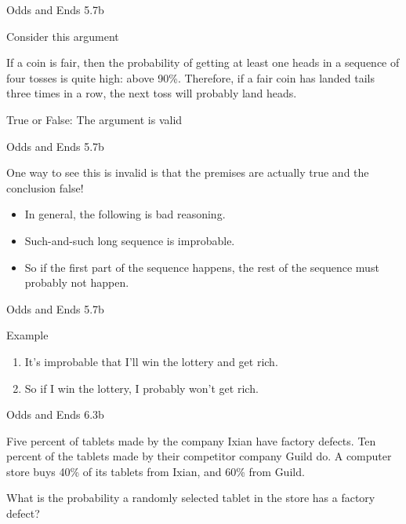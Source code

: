 \documentclass[
  ignorenonframetext,
]{beamer}
\providecommand{\tightlist}{%
  \setlength{\itemsep}{0pt}\setlength{\parskip}{0pt}}
\renewcommand{\,}{\text{, }}
\renewenvironment*{quote}	
	{\list{}{\rightmargin   \leftmargin} \item } 	
	{\endlist }
\begin{document}
\begin{frame}{Odds and Ends 5.7b}
\protect\hypertarget{odds-and-ends-5.7b}{}

Consider this argument

\begin{quote}
If a coin is fair, then the probability of getting at least one heads in
a sequence of four tosses is quite high: above 90\%. Therefore, if a
fair coin has landed tails three times in a row, the next toss will
probably land heads.
\end{quote}

True or False: The argument is valid

\end{frame}

\begin{frame}{Odds and Ends 5.7b}
\protect\hypertarget{odds-and-ends-5.7b-1}{}

One way to see this is invalid is that the premises are actually true
and the conclusion false! \pause

\begin{itemize}
\tightlist
\item
  In general, the following is bad reasoning.
\item
  Such-and-such long sequence is improbable.
\item
  So if the first part of the sequence happens, the rest of the sequence
  must probably not happen.
\end{itemize}

\end{frame}

\begin{frame}{Odds and Ends 5.7b}
\protect\hypertarget{odds-and-ends-5.7b-2}{}

Example

\begin{enumerate}
\tightlist
\item
  It's improbable that I'll win the lottery and get rich. \pause
\item
  So if I win the lottery, I probably won't get rich.
\end{enumerate}

\end{frame}

\begin{frame}{Odds and Ends 6.3b}
\protect\hypertarget{odds-and-ends-6.3b}{}

Five percent of tablets made by the company Ixian have factory defects.
Ten percent of the tablets made by their competitor company Guild do. A
computer store buys 40\% of its tablets from Ixian, and 60\% from Guild.

What is the probability a randomly selected tablet in the store has a
factory defect?

\end{frame}
\end{document}
